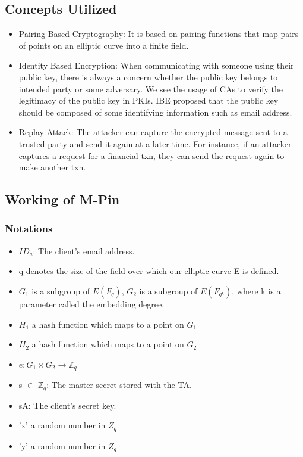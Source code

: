 \documentclass[]{article}   %
\begin{document}
\subsection*{Concepts Utilized}
\begin{itemize}
    \item Pairing Based Cryptography: It is based on pairing functions that map pairs of points on an elliptic curve into a finite field.
    \item Identity Based Encryption: When communicating with someone using their public key, there is always a concern whether the public key belongs to intended party or some adversary. We see the usage of CAs to verify the legitimacy of the public key in PKIs. IBE proposed that the public key should be composed of some identifying information such as email address.
    \item  Replay Attack: The attacker can capture the encrypted message sent to a trusted party and send it again at a later time. For instance, if an attacker captures a request for a financial txn, they can send the request again to make another txn.
\end{itemize}
\subsection*{Working of M-Pin}
\subsubsection*{Notations}
\begin{itemize}
    \item $ID_a$: The client's email address.
    \item q denotes the size of the field over which our elliptic curve E is defined.
    \item $G_1$ is a subgroup of $E(F_q )$, $G_2$ is a subgroup of $E(F_{q^k} )$, where k is a parameter  called the embedding degree.
    \item $H_1$ a hash function which maps to a point on $G_1$
    \item $H_2$ a hash function which maps to a point on $G_2$
    \item $e: G_1 \times  G_2 \rightarrow $$\mathbb{Z}_q$
    \item s $\in$ $\mathbb{Z}_q$: The master secret stored with the TA.
    \item sA: The client's secret key.
    \item 'x' a random number in $Z_q$
    \item 'y' a random number in $Z_q$
\end{itemize}
\newpage
\end{document}
